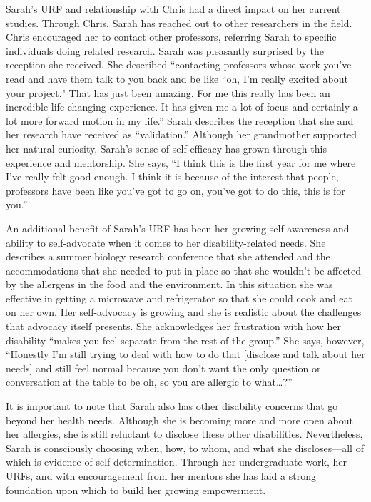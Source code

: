 \documentclass[11.5pt]{sig-alternate} %
\begin{document}
\begin{large}
Sarah's URF and relationship with Chris had a direct impact on her current studies. Through Chris, Sarah has reached out to other researchers in the field. Chris encouraged her to contact other professors, referring Sarah to specific individuals doing related research. Sarah was pleasantly surprised by the reception she received. She described “contacting professors whose work you've read and have them talk to you back and be like ``oh, I'm really excited about your project." That has just been amazing. For me this really has been an incredible life changing experience. It has given me a lot of focus and certainly a lot more forward motion in my life.” Sarah describes the reception that she and her research have received as “validation.” Although her grandmother supported her natural curiosity, Sarah's sense of self-efficacy has grown through this experience and mentorship. She says, “I think this is the first year for me where I've really felt good enough. I think it is because of the interest that people, professors have been like you've got to go on, you've got to do this, this is for you.”

An additional benefit of Sarah's URF has been her growing self-awareness and ability to self-advocate when it comes to her disability-related needs. She describes a summer biology research conference that she attended and the accommodations that she needed to put in place so that she wouldn't be affected by the allergens in the food and the environment. In this situation she was effective in getting a microwave and refrigerator so that she could cook and eat on her own. Her self-advocacy is growing and she is realistic about the challenges that advocacy itself presents. She acknowledges her frustration with how her disability “makes you feel separate from the rest of the group.” She says, however, “Honestly I'm still trying to deal with how to do that [disclose and talk about her needs] and still feel normal because you don't want the only question or conversation at the table to be oh, so you are allergic to what…?”

It is important to note that Sarah also has other disability concerns that go beyond her health needs. Although she is becoming more and more open about her allergies, she is still reluctant to disclose these other disabilities. Nevertheless, Sarah is consciously choosing when, how, to whom, and what she discloses—all of which is evidence of self-determination. Through her undergraduate work, her URFs, and with encouragement from her mentors she has laid a strong foundation upon which to build her growing empowerment.


\end{large}
\end{document}
